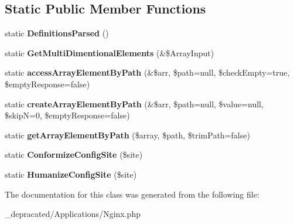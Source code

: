 \subsection*{\-Static \-Public \-Member \-Functions}
\begin{DoxyCompactItemize}
\item 
\hypertarget{class_applications_1_1_nginx_a305a375d0197ab15495885f197c6bf14}{
static {\bfseries \-Definitions\-Parsed} ()}
\label{class_applications_1_1_nginx_a305a375d0197ab15495885f197c6bf14}

\item 
\hypertarget{class_applications_1_1_nginx_abc634ffc53c98844cbaefaf07c612f7e}{
static {\bfseries \-Get\-Multi\-Dimentional\-Elements} (\&\$\-Array\-Input)}
\label{class_applications_1_1_nginx_abc634ffc53c98844cbaefaf07c612f7e}

\item 
\hypertarget{class_applications_1_1_nginx_aedda99ea3e18ba33ada0d88128dd6c43}{
static {\bfseries access\-Array\-Element\-By\-Path} (\&\$arr, \$path=null, \$check\-Empty=true, \$empty\-Response=false)}
\label{class_applications_1_1_nginx_aedda99ea3e18ba33ada0d88128dd6c43}

\item 
\hypertarget{class_applications_1_1_nginx_ac476b2e3fc3a5ca462da3b2bc4f09c33}{
static {\bfseries create\-Array\-Element\-By\-Path} (\&\$arr, \$path=null, \$value=null, \$skip\-N=0, \$empty\-Response=false)}
\label{class_applications_1_1_nginx_ac476b2e3fc3a5ca462da3b2bc4f09c33}

\item 
\hypertarget{class_applications_1_1_nginx_a19e96313e0b4d4eb1eaee01d5443f782}{
static {\bfseries get\-Array\-Element\-By\-Path} (\$array, \$path, \$trim\-Path=false)}
\label{class_applications_1_1_nginx_a19e96313e0b4d4eb1eaee01d5443f782}

\item 
\hypertarget{class_applications_1_1_nginx_a3ba45402c4070a83220175c45db13e69}{
static {\bfseries \-Conformize\-Config\-Site} (\$site)}
\label{class_applications_1_1_nginx_a3ba45402c4070a83220175c45db13e69}

\item 
\hypertarget{class_applications_1_1_nginx_a2372ad98d76fc75682830aed5e1236a6}{
static {\bfseries \-Humanize\-Config\-Site} (\$site)}
\label{class_applications_1_1_nginx_a2372ad98d76fc75682830aed5e1236a6}

\end{DoxyCompactItemize}


\-The documentation for this class was generated from the following file\-:\begin{DoxyCompactItemize}
\item 
\-\_\-depracated/\-Applications/\-Nginx.\-php\end{DoxyCompactItemize}

